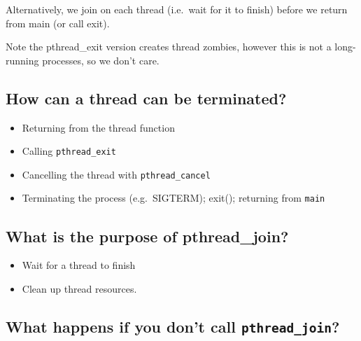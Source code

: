 Alternatively, we join on each thread (i.e.~wait for it to finish)
before we return from main (or call exit).

\begin{Shaded}
\begin{Highlighting}[]
 
  \NormalTok{);}
  \NormalTok{);}
   \NormalTok{;}
\NormalTok{\}}
\end{Highlighting}
\end{Shaded}

Note the pthread\_exit version creates thread zombies, however this is
not a long-running processes, so we don't care.

\subsection{How can a thread can be
terminated?}\label{how-can-a-thread-can-be-terminated}

\begin{itemize}
\itemsep1pt\parskip0pt
\item
  Returning from the thread function
\item
  Calling \texttt{pthread\_exit}
\item
  Cancelling the thread with \texttt{pthread\_cancel}
\item
  Terminating the process (e.g.~SIGTERM); exit(); returning from
  \texttt{main}
\end{itemize}

\subsection{What is the purpose of
pthread\_join?}\label{what-is-the-purpose-of-pthreadux5fjoin}

\begin{itemize}
\itemsep1pt\parskip0pt
\item
  Wait for a thread to finish
\item
  Clean up thread resources.
\end{itemize}

\subsection{\texorpdfstring{What happens if you don't call
\texttt{pthread\_join}?}{What happens if you don't call pthread\_join?}}\label{what-happens-if-you-dont-call-pthreadux5fjoin}

